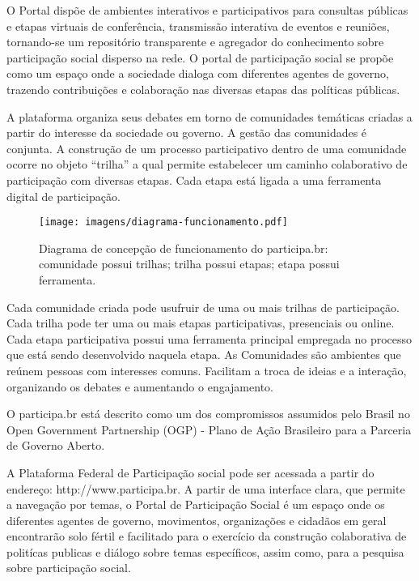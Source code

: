 \documentclass{article}
\begin{document}
O Portal dispõe de ambientes interativos e participativos para consultas
públicas e etapas virtuais de conferência, transmissão interativa de eventos e
reuniões, tornando-se um repositório transparente e agregador do conhecimento
sobre participação social disperso na rede. O portal de participação social se
propõe como um espaço onde a sociedade dialoga com diferentes agentes de
governo, trazendo contribuições e colaboração nas diversas etapas das políticas
públicas.

A plataforma organiza seus debates em torno de comunidades temáticas criadas a
partir do interesse da sociedade ou governo. A gestão das comunidades é
conjunta. A construção de um processo participativo dentro de uma comunidade
ocorre no objeto ``trilha'' a qual permite estabelecer um caminho colaborativo de
participação com diversas etapas. Cada etapa está ligada a uma ferramenta
digital de participação.  

\begin{figure}[h]
  \center
  \texttt{[image: imagens/diagrama-funcionamento.pdf]}
  \caption{Diagrama de concepção de funcionamento do participa.br: comunidade possui trilhas; trilha possui etapas; etapa possui ferramenta.}
  \label{diagrama-funcionamento}
\end{figure}

Cada comunidade criada pode usufruir de uma ou mais trilhas de participação.
Cada trilha pode ter uma ou mais etapas participativas, presenciais ou online.
Cada etapa participativa possui uma ferramenta principal empregada no processo
que está sendo desenvolvido naquela etapa. As Comunidades são ambientes que
reúnem pessoas com interesses comuns. Facilitam a troca de ideias e a
interação, organizando os debates e aumentando o engajamento. 

O participa.br está descrito como um dos compromissos assumidos pelo Brasil no
Open Government Partnership (OGP) - Plano de Ação Brasileiro para a Parceria de
Governo Aberto.

A Plataforma Federal de Participação social pode ser acessada a partir do
endereço: http://www.participa.br. A partir de uma interface clara, que permite
a navegação por temas, o Portal de Participação Social é um espaço onde os
diferentes agentes de governo, movimentos, organizações e cidadãos em geral
encontrarão solo fértil e facilitado para o exercício da construção
colaborativa de politícas publicas e diálogo sobre temas específicos, assim
como, para a pesquisa sobre participação social.
\end{document}
